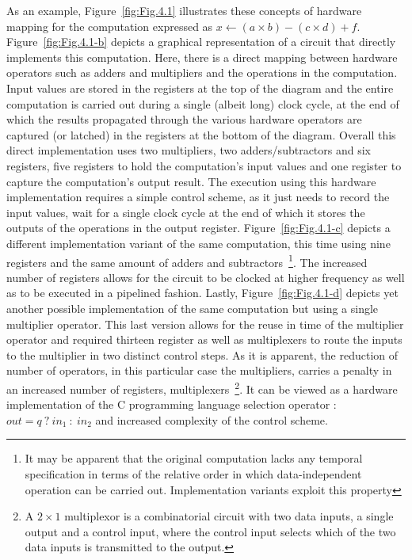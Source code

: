 As an example, Figure~\ref{fig:Fig.4.1} illustrates these concepts of hardware mapping for the computation expressed as $x \gets (a \times b) - (c \times d) + f$.  Figure~\ref{fig:Fig.4.1-b} depicts a graphical representation of a circuit that directly implements this computation. 
Here, there is a direct mapping between hardware operators such as adders and multipliers and the operations in the computation. 
Input values are stored in the registers at the top of the diagram and the entire computation is carried out during a single (albeit long) clock cycle, at the end of which the results propagated through the various hardware operators are captured (or latched) in the registers at the bottom of the diagram. 
Overall this direct implementation uses two multipliers, two adders/subtractors and six registers, five registers to hold the computation's input values and one register to capture the computation's output result.
The execution using this hardware implementation  requires a simple control scheme, as it just needs to record the input values, wait for a single clock cycle at the end of which it stores the outputs of the operations in the output register. 
Figure~\ref{fig:Fig.4.1-c} depicts a different implementation variant of the same computation, this time using nine registers and the same amount of adders and subtractors~\footnote{It may be apparent that the original computation lacks any temporal specification in terms of the relative order in which data-independent operation can be carried out. Implementation variants exploit this property}.
The increased number of registers allows for the circuit to be clocked at higher frequency as well as to be executed in a pipelined fashion. 
Lastly, Figure~\ref{fig:Fig.4.1-d} depicts yet another possible implementation of the same computation but using a single multiplier operator.  This last version allows for the reuse in time of the multiplier operator and required thirteen register as well as multiplexers to route the inputs to the multiplier in two distinct control steps. 
As it is apparent, the reduction of number of operators, in this particular case the multipliers, carries a penalty in an increased number of registers, multiplexers~\footnote{A $2\times1$ multiplexor is a combinatorial circuit with two data inputs, a single output and a control input, where the control input selects which of the two data inputs is transmitted to the output.}. 
  It can be viewed as a hardware implementation of the C programming language selection operator : $\textit{out}=q\ ?\ \textit{in}_1\ :\ \textit{in}_2 $ and increased complexity of the control scheme.\\


